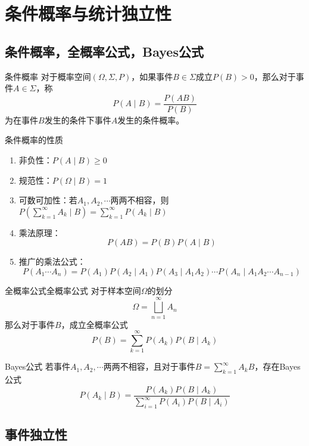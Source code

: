 \documentclass[lang = cn, scheme = chinese, thmcnt = section]{elegantbook}
\newcommand{\dis}{\displaystyle}
\begin{document}
\chapter{条件概率与统计独立性}

\section{条件概率，全概率公式，Bayes公式}

\begin{definition}{条件概率}
	对于概率空间$(\Omega,\Sigma,P)$，如果事件$B\in\Sigma$成立$P(B)>0$，那么对于事件$A\in\Sigma$，称%
	$$
	P(A\mid B)=\frac{P(AB)}{P(B)}
	$$
	为在事件$B$发生的条件下事件$A$发生的条件概率。
\end{definition}

\begin{proposition}{条件概率的性质}
	\begin{enumerate}
		\item 非负性：$P(A \mid B)\ge 0$
		\item 规范性：$P(\Omega \mid B)=1$
		\item 可数可加性：若$A_1,A_2,\cdots$两两不相容，则$\dis P\left(\sum_{k=1}^{\infty}{A_k} \mid B\right)=\sum_{k=1}^{\infty}{P(A_k \mid B)}$
		\item 乘法原理：
		$$
		P(AB)=P(B)P(A \mid B)
		$$
		\item 推广的乘法公式：
		$$
		P(A_1\cdots A_n)=P(A_1)P(A_2 \mid A_1)P(A_3 \mid A_1A_2)\cdots P(A_n \mid A_1A_2\cdots A_{n-1})
		$$
	\end{enumerate}
\end{proposition}

\begin{theorem}{全概率公式}{全概率公式}
	对于样本空间$\Omega$的划分%
	$$
	\Omega=\bigsqcup_{n=1}^{\infty}A_n
	$$
	那么对于事件$B$，成立全概率公式%
	$$
	P(B)=\sum_{k=1}^{\infty}{P(A_k)P(B \mid A_k)}
	$$
\end{theorem}

\begin{theorem}{Bayes公式}
	若事件$A_1,A_2,\cdots$两两不相容，且对于事件$B=\sum_{k=1}^{\infty}{A_kB}$，存在Bayes公式
	$$
	P(A_k \mid B)=\frac{P(A_k)P(B \mid A_k)}{\dis\sum_{i=1}^{\infty}{P(A_i)P(B \mid A_i)}}
	$$
\end{theorem}

\section{事件独立性}
\end{document}
